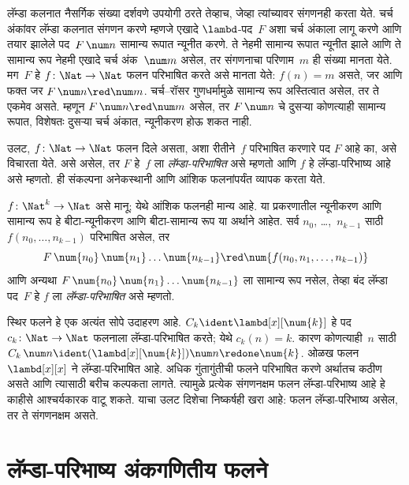 लॅम्डा कलनात नैसर्गिक संख्या दर्शवणे उपयोगी ठरते
तेव्हाच, जेव्हा त्यांच्यावर संगणनही करता येते.
चर्च अंकांवर लॅम्डा कलनात संगणन करणे म्हणजे
एखादे $\lambd$-पद~$F$ अशा चर्च अंकाला लागू करणे
आणि तयार झालेले पद~$F\, \num n$ सामान्य रूपात
न्यूनीत करणे. ते नेहमी सामान्य रूपात न्यूनीत झाले
आणि ते सामान्य रूप नेहमी एखादे चर्च अंक~$\num m$
असेल, तर संगणनाचा परिणाम~$m$ ही संख्या मानता येते.
मग~$F$ हे $f\colon \Nat \to \Nat$ फलन परिभाषित
करते असे मानता येते: $f(n) = m$ असते, जर आणि फक्त जर
$F\, \num n \red \num m$. चर्च–रॉसर गुणधर्मामुळे
सामान्य रूप अस्तित्वात असेल, तर ते एकमेव असते.
म्हणून $F\, \num n \red \num m$ असेल, तर
$F \, \num n$ चे दुसऱ्या कोणत्याही सामान्य रूपात,
विशेषतः दुसऱ्या चर्च अंकात, न्यूनीकरण होऊ शकत नाही.

उलट, $f\colon \Nat \to \Nat$ फलन दिले असता,
अशा रीतीने~$f$ परिभाषित करणारे पद $F$ आहे का,
असे विचारता येते. असे असेल, तर $F$ हे~$f$ ला
\emph{लॅम्डा-परिभाषित} असे म्हणतो आणि $f$ हे
लॅम्डा-परिभाष्य आहे असे म्हणतो. ही संकल्पना
अनेकस्थानी आणि आंशिक फलनांपर्यंत व्यापक करता येते.

\begin{defn}
$f\colon \Nat^k \to \Nat$ असे मानू; येथे आंशिक
फलनही मान्य आहे. या प्रकरणातील न्यूनीकरण आणि सामान्य
रूप हे बीटा-न्यूनीकरण आणि बीटा-सामान्य रूप या अर्थाने आहेत. सर्व
$n_0$, \dots,~$n_{k-1}$ साठी $f(n_0, \dots,
n_{k-1})$ परिभाषित असेल, तर
\[F \, \num{n_0} \, \num{n_1} \dots \num{n_{k-1}} \red \num{f(n_0, n_1, \dots,
  n_{k-1})}
\]
आणि अन्यथा $F \, \num{n_0} \,
\num{n_1} \dots \num{n_{k-1}}$ ला सामान्य रूप
नसेल, तेव्हा बंद लॅम्डा पद~$F$ हे $f$ ला
\emph{लॅम्डा-परिभाषित} असे म्हणतो.
\end{defn}

स्थिर फलने हे एक अत्यंत सोपे उदाहरण आहे.
$C_k \ident \lambd[x][\num{k}]$ हे पद
$c_k\colon \Nat \to \Nat$ फलनाला
लॅम्डा-परिभाषित करते; येथे $c_k(n) = k$.
कारण कोणत्याही~$n$ साठी $C_k \, \num n \ident
(\lambd[x][\num{k}])\num n \redone \num{k}$.
ओळख फलन $\lambd[x][x]$ ने लॅम्डा-परिभाषित आहे.
अधिक गुंतागुंतीची फलने परिभाषित करणे अर्थातच
कठीण असते आणि त्यासाठी बरीच कल्पकता लागते.
त्यामुळे प्रत्येक संगणनक्षम फलन लॅम्डा-परिभाष्य
आहे हे काहीसे आश्चर्यकारक वाटू शकते. याचा उलट
दिशेचा निष्कर्षही खरा आहे: फलन लॅम्डा-परिभाष्य
असेल, तर ते संगणनक्षम असते.











\section{लॅम्डा-परिभाष्य अंकगणितीय फलने}\label{lam:rep:arf:sec}

